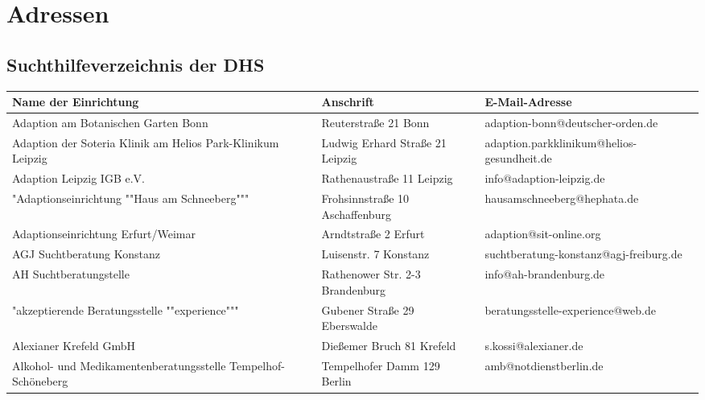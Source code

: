 ﻿\chapter{Adressen}
\label{adressen}
\section{Suchthilfeverzeichnis der DHS}

{
\small
\renewcommand{\arraystretch}{1.1}
\begin{xltabular}{\textwidth} {
 >{\raggedright\arraybackslash}p{5cm}
 >{\raggedright\arraybackslash}X
 >{\raggedright\arraybackslash}p{5cm} }
 \toprule
Name der Einrichtung & Anschrift & E-Mail-Adresse \\
\midrule
Adaption am Botanischen Garten Bonn & Reuterstraße 21 Bonn & adaption-bonn@deutscher-orden.de \\
Adaption der Soteria Klinik am Helios Park-Klinikum Leipzig & Ludwig Erhard Straße 21 Leipzig & adaption.parkklinikum@helios-gesundheit.de \\
Adaption Leipzig IGB e.V. & Rathenaustraße 11 Leipzig & info@adaption-leipzig.de \\
"Adaptionseinrichtung ""Haus am Schneeberg""" & Frohsinnstraße 10 Aschaffenburg & hausamschneeberg@hephata.de \\
Adaptionseinrichtung Erfurt/Weimar & Arndtstraße 2 Erfurt & adaption@sit-online.org \\
AGJ Suchtberatung Konstanz & Luisenstr. 7 Konstanz & suchtberatung-konstanz@agj-freiburg.de \\
AH Suchtberatungstelle & Rathenower Str. 2-3 Brandenburg & info@ah-brandenburg.de \\
"akzeptierende Beratungsstelle ""experience""" & Gubener Straße 29 Eberswalde & beratungsstelle-experience@web.de \\
Alexianer Krefeld GmbH & Dießemer Bruch 81 Krefeld & s.kossi@alexianer.de \\
Alkohol- und Medikamentenberatungsstelle Tempelhof-Schöneberg & Tempelhofer Damm 129 Berlin & amb@notdienstberlin.de \\

\end{xltabular}}

